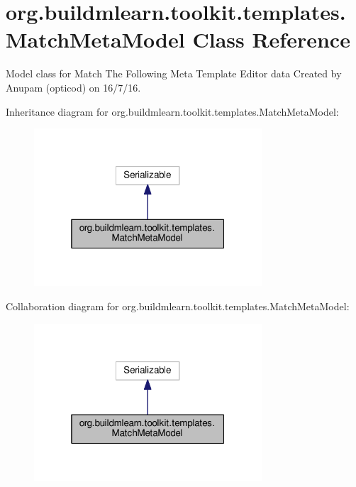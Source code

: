 \hypertarget{classorg_1_1buildmlearn_1_1toolkit_1_1templates_1_1MatchMetaModel}{}\section{org.\+buildmlearn.\+toolkit.\+templates.\+Match\+Meta\+Model Class Reference}
\label{classorg_1_1buildmlearn_1_1toolkit_1_1templates_1_1MatchMetaModel}


Model class for Match The Following Meta Template Editor data Created by Anupam (opticod) on 16/7/16.  




Inheritance diagram for org.\+buildmlearn.\+toolkit.\+templates.\+Match\+Meta\+Model\+:
\nopagebreak
\begin{figure}[H]
\begin{center}
\leavevmode
\includegraphics[width=241pt]{classorg_1_1buildmlearn_1_1toolkit_1_1templates_1_1MatchMetaModel__inherit__graph}
\end{center}
\end{figure}


Collaboration diagram for org.\+buildmlearn.\+toolkit.\+templates.\+Match\+Meta\+Model\+:
\nopagebreak
\begin{figure}[H]
\begin{center}
\leavevmode
\includegraphics[width=241pt]{classorg_1_1buildmlearn_1_1toolkit_1_1templates_1_1MatchMetaModel__coll__graph}
\end{center}
\end{figure}

